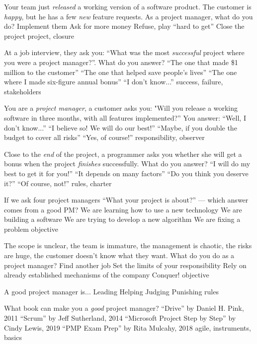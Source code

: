 \documentclass{article}
\begin{document}

\pmbaQuestion
  {Your team just \emph{released} a working version of a software product. The customer is \emph{happy}, but he has a few \emph{new} feature requests. As a project manager, what do you do?}
  {Implement them}
  {Ask for more money}
  {Refuse, play ``hard to get''}
  {Close the project}
  {project, closure}

\pmbaQuestion
  {At a job interview, they ask you: ``What was the most \emph{successful} project where you were a project manager?''. What do you answer?}
  {``The one that made \$1 million to the customer''}
  {``The one that helped save people's lives''}
  {``The one where I made six-figure annual bonus''}
  {``I don't know...''}
  {success, failure, stakeholders}

\pmbaQuestion
  {You are a \emph{project manager}, a customer asks you: "Will you release a working software in three months, with all features implemented?'' You answer:}
  {``Well, I don't know...''}
  {``I believe so! We will do our best!''}
  {``Maybe, if you double the budget to cover all risks''}
  {``Yes, of course!''}
  {responsibility, observer}

\pmbaQuestion
  {Close to the \emph{end} of the project, a programmer asks you whether she will get a bonus when the project \emph{finishes} successfully. What do you answer?}
  {``I will do my best to get it for you!''}
  {``It depends on many factors''}
  {``Do you think you deserve it?''}
  {``Of course, not!''}
  {rules, charter}

\pmbaQuestion
  {If we ask four project managers ``What your project is about?'' --- which answer comes from a good PM?}
  {We are learning how to use a new technology}
  {We are building a software}
  {We are trying to develop a new algorithm}
  {We are fixing a problem}
  {objective}

\pmbaQuestion
  {The scope is unclear, the team is immature, the management is chaotic, the risks are huge, the customer doesn't know what they want. What do you do as a project manager?}
  {Find another job}
  {Set the limits of your responsibility}
  {Rely on already established mechanisms of the company}
  {Conquer!}
  {objective}

\pmbaQuestion
  {A good project manager is...}
  {Leading}
  {Helping}
  {Judging}
  {Punishing}
  {rules}

\pmbaQuestion
  {What book can make you a \emph{good} project manager?}
  {``Drive'' by Daniel H. Pink, 2011}
  {``Scrum'' by Jeff Sutherland, 2014}
  {``Microsoft Project Step by Step'' by Cindy Lewis, 2019}
  {``PMP Exam Prep'' by Rita Mulcahy, 2018}
  {agile, instruments, basics}
\end{document}
